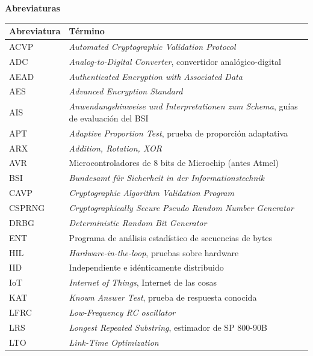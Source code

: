 \clearpage
{\bfseries\fontsize{14}{16}\selectfont Abreviaturas\par}
\nopagebreak\vspace{0.5ex}
{\small\interlineadoSencillo\setlength{\LTleft}{0pt}\setlength{\LTright}{0pt plus 1fill}
\begin{longtable}{@{}p{3.0cm}p{11.0cm}@{}}
\textbf{Abreviatura} & \textbf{Término}\\[0.6ex]
\endhead
ACVP & \textit{Automated Cryptographic Validation Protocol}\\[0.6ex]
ADC & \textit{Analog-to-Digital Converter}, convertidor analógico-digital\\[0.6ex]
AEAD & \textit{Authenticated Encryption with Associated Data}\\[0.6ex]
AES & \textit{Advanced Encryption Standard}\\[0.6ex]
AIS & \textit{Anwendungshinweise und Interpretationen zum Schema}, guías de evaluación del BSI\\[0.6ex]
APT & \textit{Adaptive Proportion Test}, prueba de proporción adaptativa\\[0.6ex]
ARX & \textit{Addition, Rotation, XOR}\\[0.6ex]
AVR & Microcontroladores de 8 bits de Microchip (antes Atmel)\\[0.6ex]
BSI & \textit{Bundesamt für Sicherheit in der Informationstechnik}\\[0.6ex]
CAVP & \textit{Cryptographic Algorithm Validation Program}\\[0.6ex]
CSPRNG & \textit{Cryptographically Secure Pseudo Random Number Generator}\\[0.6ex]
DRBG & \textit{Deterministic Random Bit Generator}\\[0.6ex]
ENT & Programa de análisis estadístico de secuencias de bytes\\[0.6ex]
HIL & \textit{Hardware-in-the-loop}, pruebas sobre hardware\\[0.6ex]
IID & Independiente e idénticamente distribuido\\[0.6ex]
IoT & \textit{Internet of Things}, Internet de las cosas\\[0.6ex]
KAT & \textit{Known Answer Test}, prueba de respuesta conocida\\[0.6ex]
LFRC & \textit{Low-Frequency RC oscillator}\\[0.6ex]
LRS & \textit{Longest Repeated Substring}, estimador de SP 800-90B\\[0.6ex]
LTO & \textit{Link-Time Optimization}\\[0.6ex]

\end{longtable}}
